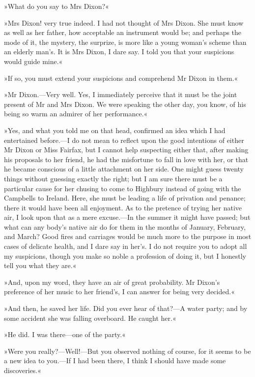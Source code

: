 »What do you say to Mrs Dixon?«

»Mrs Dixon! very true indeed. I had not thought of Mrs Dixon. She must know as well as her father, how acceptable an instrument would be; and perhaps the mode of it, the mystery, the surprize, is more like a young woman's scheme than an elderly man's. It is Mrs Dixon, I dare say. I told you that your suspicions would guide mine.«

»If so, you must extend your suspicions and comprehend Mr Dixon in them.«

»Mr Dixon.—Very well. Yes, I immediately perceive that it must be the joint present of Mr and Mrs Dixon. We were speaking the other day, you know, of his being so warm an admirer of her performance.«

»Yes, and what you told me on that head, confirmed an idea which I had entertained before.—I do not mean to reflect upon the good intentions of either Mr Dixon or Miss Fairfax, but I cannot help suspecting either that, after making his proposals to her friend, he had the misfortune to fall in love with her, or that he became conscious of a little attachment on her side. One might guess twenty things without guessing exactly the right; but I am sure there must be a particular cause for her chusing to come to Highbury instead of going with the Campbells to Ireland. Here, she must be leading a life of privation and penance; there it would have been all enjoyment. As to the pretence of trying her native air, I look upon that as a mere excuse.—In the summer it might have passed; but what can any body's native air do for them in the months of January, February, and March? Good fires and carriages would be much more to the purpose in most cases of delicate health, and I dare say in her's. I do not require you to adopt all my suspicions, though you make so noble a profession of doing it, but I honestly tell you what they are.«

»And, upon my word, they have an air of great probability. Mr Dixon's preference of her music to her friend's, I can answer for being very decided.«

»And then, he saved her life. Did you ever hear of that?—A water party; and by some accident she was falling overboard. He caught her.«

»He did. I was there—one of the party.«

»Were you really?—Well!—But you observed nothing of course, for it seems to be a new idea to you.—If I had been there, I think I should have made some discoveries.«

